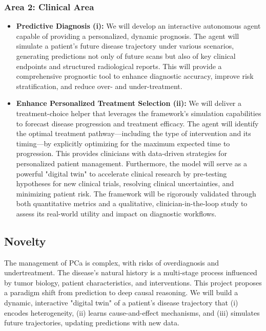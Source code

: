 \documentclass[11pt, a4paper]{article}
\begin{document}
\subsubsection*{Area 2: Clinical Area}
\begin{itemize}
    \item \textbf{Predictive Diagnosis (i):} We will develop an interactive autonomous agent capable of providing a personalized, dynamic prognosis. The agent will simulate a patient's future disease trajectory under various scenarios, generating predictions not only of future scans but also of key clinical endpoints and structured radiological reports. This will provide a comprehensive prognostic tool to enhance diagnostic accuracy, improve risk stratification, and reduce over- and under-treatment.

    \item \textbf{Enhance Personalized Treatment Selection (ii):} We will deliver a treatment-choice helper that leverages the framework's simulation capabilities to forecast disease progression and treatment efficacy. The agent will identify the optimal treatment pathway—including the type of intervention and its timing—by explicitly optimizing for the maximum expected time to progression. This provides clinicians with data-driven strategies for personalized patient management. Furthermore, the model will serve as a powerful "digital twin" to accelerate clinical research by pre-testing hypotheses for new clinical trials, resolving clinical uncertainties, and minimizing patient risk. The framework will be rigorously validated through both quantitative metrics and a qualitative, clinician-in-the-loop study to assess its real-world utility and impact on diagnostic workflows.
\end{itemize}

\subsection{Novelty}
The management of PCa is complex, with risks of overdiagnosis and undertreatment. The disease's natural history is a multi-stage process influenced by tumor biology, patient characteristics, and interventions. This project proposes a paradigm shift from prediction to deep causal reasoning. We will build a dynamic, interactive "digital twin" of a patient’s disease trajectory that (i) encodes heterogeneity, (ii) learns cause-and-effect mechanisms, and (iii) simulates future trajectories, updating predictions with new data.
\end{document}
